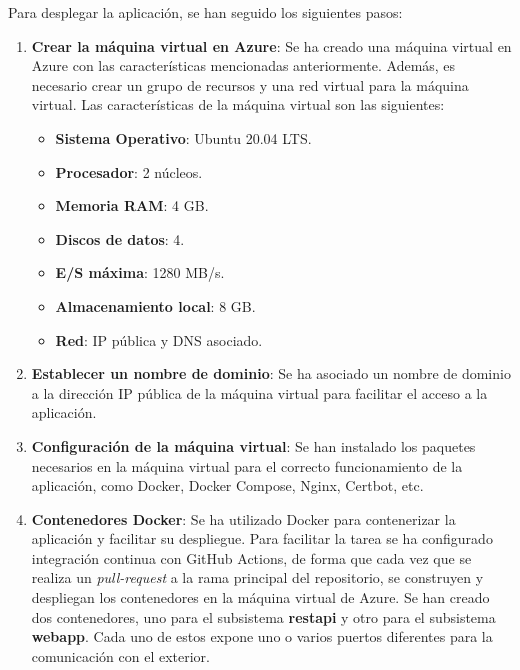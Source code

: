 Para desplegar la aplicación, se han seguido los siguientes pasos:
\begin{enumerate}
    \item \textbf{Crear la máquina virtual en Azure}: Se ha creado una máquina virtual en Azure con las características mencionadas anteriormente. 
    Además, es necesario crear un grupo de recursos y una red virtual para la máquina virtual. Las características de la máquina virtual son las siguientes:
    \begin{itemize}
        \item \textbf{Sistema Operativo}: Ubuntu 20.04 LTS.
        \item \textbf{Procesador}: 2 núcleos.
        \item \textbf{Memoria RAM}: 4 GB.
        \item \textbf{Discos de datos}: 4.
        \item \textbf{E/S máxima}: 1280 MB/s.
        \item \textbf{Almacenamiento local}: 8 GB.
        \item \textbf{Red}: IP pública y DNS asociado.
    \end{itemize}

    \item \textbf{Establecer un nombre de dominio}: Se ha asociado un nombre de dominio a la dirección IP pública de la máquina virtual para facilitar el acceso a la aplicación.

    \item \textbf{Configuración de la máquina virtual}: Se han instalado los paquetes necesarios en la máquina virtual para el correcto funcionamiento de la aplicación, como Docker, Docker Compose, Nginx, Certbot, etc.
    
    \item \textbf{Contenedores Docker}: Se ha utilizado Docker para contenerizar la aplicación y facilitar su despliegue. 
    Para facilitar la tarea se ha configurado integración continua con GitHub Actions, de forma que cada vez que se realiza un \textit{pull-request} a la rama principal del repositorio, se construyen y despliegan los contenedores en la máquina virtual de Azure.
    Se han creado dos contenedores, uno para el subsistema \textbf{restapi} y otro para el subsistema \textbf{webapp}. Cada uno de estos expone uno o varios puertos diferentes para la comunicación con el exterior.


\end{enumerate}

